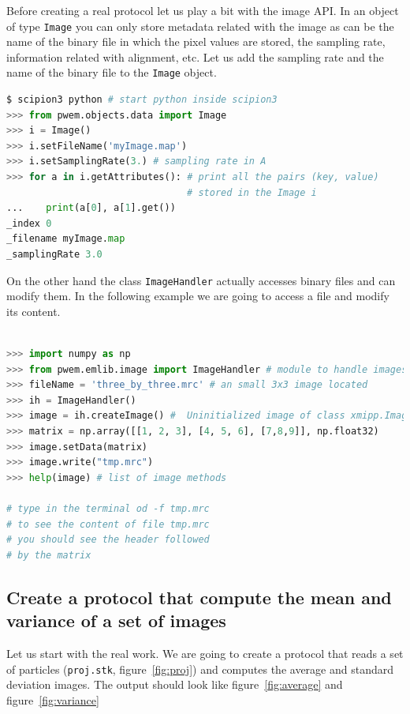 \documentclass[12pt]{article} %
\newcommand{\ttt}[1]{\texttt{#1}}
\begin{document}
Before creating a real protocol let us play a bit with the image API. In an object of type \ttt{Image} you can only store metadata related with the image as can be the name of the binary file in which the pixel values are stored, the sampling rate, information related with alignment, etc. Let us add the sampling rate and the name of the binary file to the \ttt{Image} object.

\begin{lstlisting}[language=Python, caption={The following script creates an object of the class \ttt{Image}.}]
$ scipion3 python # start python inside scipion3
>>> from pwem.objects.data import Image
>>> i = Image()
>>> i.setFileName('myImage.map')
>>> i.setSamplingRate(3.) # sampling rate in A
>>> for a in i.getAttributes(): # print all the pairs (key, value) 
                                # stored in the Image i
...    print(a[0], a[1].get())
_index 0
_filename myImage.map
_samplingRate 3.0

\end{lstlisting}

On the other hand the class \ttt{ImageHandler} actually accesses binary files and can modify them. In the following
example we are going to access a file and modify its content.

\begin{lstlisting}[language=Python, caption={The following script creates a $3\times3$ binary image using \ttt{ImageHandler}}]

>>> import numpy as np
>>> from pwem.emlib.image import ImageHandler # module to handle images
>>> fileName = 'three_by_three.mrc' # an small 3x3 image located
>>> ih = ImageHandler()
>>> image = ih.createImage() #  Uninitialized image of class xmipp.Image
>>> matrix = np.array([[1, 2, 3], [4, 5, 6], [7,8,9]], np.float32)
>>> image.setData(matrix)
>>> image.write("tmp.mrc")
>>> help(image) # list of image methods

# type in the terminal od -f tmp.mrc
# to see the content of file tmp.mrc
# you should see the header followed
# by the matrix
\end{lstlisting}


\subsection{Create a protocol that compute the mean and variance of a set of images}

Let us start with the real work. We are going to create a protocol that reads a set of particles (\ttt{proj.stk}, figure~\ref{fig:proj}) and computes the average and standard deviation images. The output should look like figure~\ref{fig:average} and figure~\ref{fig:variance}
\end{document}
